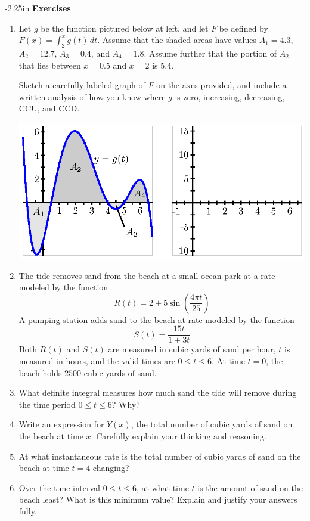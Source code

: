 \begin{adjustwidth*}{}{-2.25in}
\textbf{{\large Exercises}}
\setlength{\columnsep}{25pt}
\begin{multicols*}{2}
 \small

\begin{enumerate}[1)]
\item Let $g$ be the function pictured below at left, and let $F$ be defined by $F(x) = \int_{2}^x g(t) \, dt.$ Assume that the shaded areas have values $A_1 = 4.3$, $A_2 = 12.7$, $A_3 = 0.4$, and $A_4 = 1.8$.  Assume further that the portion of $A_2$ that lies between $x = 0.5$ and $x = 2$ is $5.4$.  
  
Sketch a carefully labeled graph of $F$ on the axes provided, and include a written analysis of how you know where $g$ is zero, increasing, decreasing, CCU, and CCD. 
 
\includegraphics[scale=.75]{figures/5_2_Ez1.eps}

\item The tide removes sand from the beach at a small ocean park at a rate modeled by the function $$R(t) = 2 + 5\sin \left( \frac{4\pi t}{25} \right)$$
A pumping station adds sand to the beach at rate modeled by the function
$$S(t) = \frac{15t}{1+3t}$$
Both $R(t)$ and $S(t)$ are measured in cubic yards of sand per hour, $t$ is measured in hours, and the valid times are $0 \le t \le 6$.  At time $t = 0$, the beach holds $2500$ cubic yards of sand.

	\ba
		\item What definite integral measures how much sand the tide will remove during the time period $0 \le t \le 6$?  Why? 
		\item Write an expression for $Y(x)$, the total number of cubic yards of sand on the beach at time $x$.  Carefully explain your thinking and reasoning.
		\item At what instantaneous rate is the total number of cubic yards of sand on the beach at time $t = 4$ changing?  
		\item Over the time interval $0 \le t \le 6$, at what time $t$ is the amount of sand on the beach least?  What is this minimum value?  Explain and justify your answers fully.
	\ea
	

\end{enumerate}
\end{multicols*}
\end{adjustwidth*}
